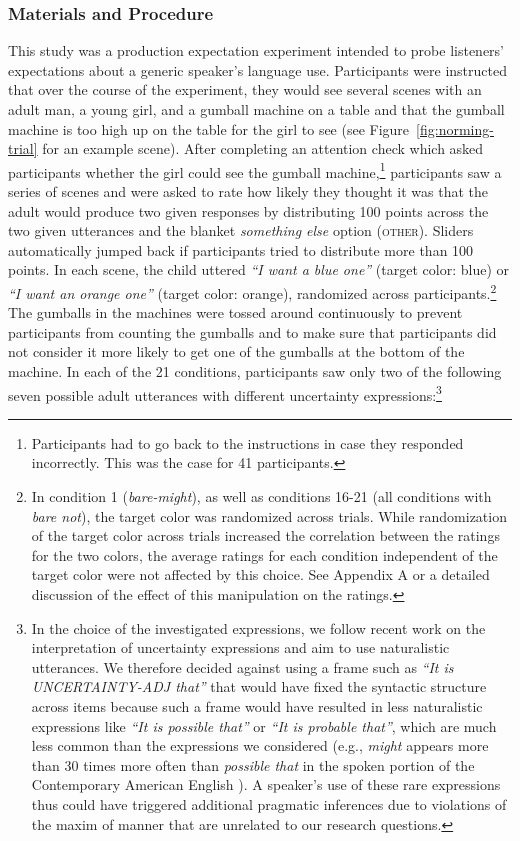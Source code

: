 \subsubsection{Materials and Procedure}
This study was a production expectation experiment intended to probe listeners' expectations about a generic speaker's language use.
Participants were instructed that over the course of the experiment, they would see several scenes with an adult man, 
a young girl, and a gumball machine on a table and 
that the gumball machine is too high up on the table for the girl to see (see Figure~\ref{fig:norming-trial} for an example scene). 
After completing an attention check which asked participants whether 
the girl could see the gumball machine,\footnote{Participants had to go back to the instructions in case they responded incorrectly. This was the case for 41 participants.} 
participants saw a series of scenes  and were asked to rate how likely they thought it was that the 
adult would produce two given responses by distributing 100 points across the two given utterances and the 
blanket \textit{something else} option (\textsc{other}). Sliders automatically jumped back if participants tried to distribute more than 100 points. 
In each scene, the child uttered \textit{``I want a blue one''} (target color: blue) or  \textit{``I want an orange one''} (target color: orange), randomized across participants.\footnote{In condition 1 (\textit{bare-might}), as well as conditions 16-21 (all conditions with \textit{bare not}), the target color was randomized across trials. While randomization of the target color across trials increased the correlation between the ratings for the two colors,  the average ratings for each condition independent of the target color were not affected by this choice. See Appendix A or a detailed discussion of the effect of this manipulation on the ratings.} The gumballs in the machines were tossed around continuously to prevent participants from counting the gumballs
and to make sure that participants did not consider it more likely to get one of the gumballs at the bottom of the machine.
 In each of the 21 conditions, participants saw only  two of the following seven possible adult utterances with different uncertainty expressions:\footnote{In the choice of the investigated expressions, we follow recent work on the interpretation of uncertainty expressions \cite{Pogue2018} and aim to use naturalistic utterances. We therefore decided against using a frame such as \emph{``It is UNCERTAINTY-ADJ that''} that would have fixed the syntactic structure across items because such a frame would have resulted in less naturalistic expressions like  \emph{``It is possible that''} or  \emph{``It is probable that''}, which are much less common than the expressions we considered (e.g., \textit{might} appears more than 30 times more often than \textit{possible that} in the spoken portion of the Contemporary American English \cite{Davies2009}). A speaker's use of these rare expressions thus could have triggered additional pragmatic inferences due to violations of the maxim of manner \cite{Grice1975} that are unrelated to our research questions.}

